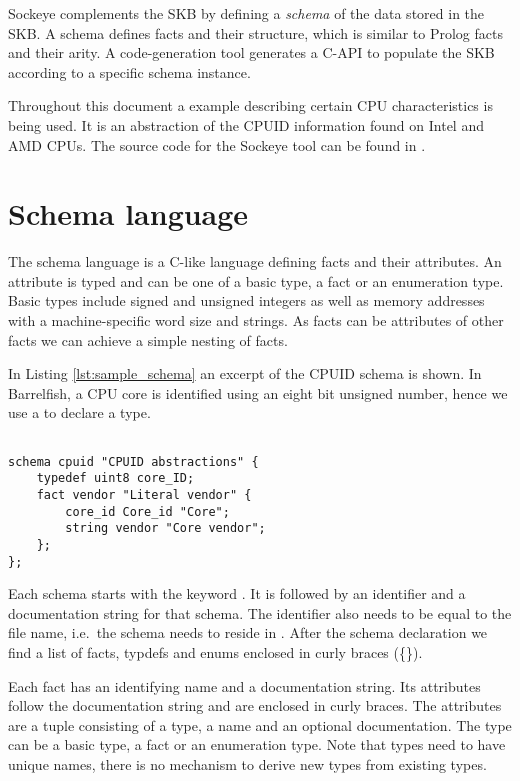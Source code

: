 \documentclass[a4paper,11pt,twoside]{report}
\begin{document}
Sockeye complements the SKB by defining a \emph{schema} of the data stored in
the SKB. A schema defines facts and their structure, which is similar to Prolog
facts and their arity. A code-generation tool generates a C-API to populate the
SKB according to a specific schema instance.

Throughout this document a example describing certain CPU characteristics is
being used. It is an abstraction of the CPUID information found on Intel and AMD
CPUs. The source code for the Sockeye tool can be found in
.

\section{Schema language}

The schema language is a C-like language defining facts and their attributes. An
attribute is typed and can be one of a basic type, a fact or an enumeration
type. Basic types include signed and unsigned integers as well as memory
addresses with a machine-specific word size and strings. As facts can be
attributes of other facts we can achieve a simple nesting of facts.

In Listing \ref{lst:sample_schema} an excerpt of the CPUID schema is shown. In
Barrelfish, a CPU core is identified using an eight bit unsigned number, hence
we use a  to declare a  type.

\begin{lstlisting}[caption={Sample Sockeye schema definition},
label={lst:sample_schema},language=sockeye]

schema cpuid "CPUID abstractions" {
    typedef uint8 core_ID;
    fact vendor "Literal vendor" {
        core_id Core_id "Core";
        string vendor "Core vendor";
    };
};
\end{lstlisting}


Each schema starts with the keyword . It is followed by an
identifier and a documentation string for that schema. The identifier also needs
to be equal to the file name, i.e.~the schema  needs to reside in
. After the schema declaration we find a list of facts,
typdefs and enums enclosed in curly braces (\{\}).

Each fact has an identifying name and a documentation string. Its attributes
follow the documentation string and are enclosed in curly braces. The attributes
are a tuple consisting of a type, a name and an optional documentation. The type
can be a basic type, a fact or an enumeration type. Note that types need to have
unique names, there is no mechanism to derive new types from existing types.
\end{document}
